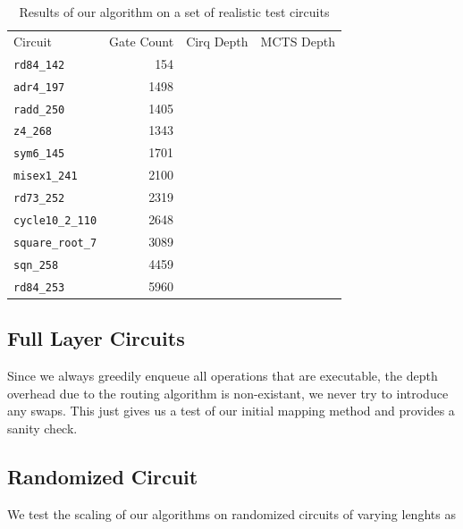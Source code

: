 \documentclass[%
 reprint,
 amsmath,amssymb,
 aps,
]{revtex4-2}
\begin{document}
\begin{table}[H]
    \caption{\label{tab:large-circuits}%
        Results of our algorithm on a set of realistic test circuits
    }
    \begin{ruledtabular}
        \begin{tabular}{lrrr}
            \textrm{Circuit}        &
            \textrm{Gate Count}     &
            \textrm{Cirq Depth}     &
            \textrm{MCTS Depth}                 \\
            \colrule

            \verb+rd84_142+ & 154  &  & \\
            \verb+adr4_197+ & 1498 &  & \\
            \verb+radd_250+ & 1405 &  & \\
            \verb+z4_268+ & 1343 &  & \\
            \verb+sym6_145+ & 1701 &  & \\
            \verb+misex1_241+ & 2100 &  & \\
            \verb+rd73_252+ & 2319 &  & \\
            \verb+cycle10_2_110+ & 2648 &  & \\
            \verb+square_root_7+ & 3089 &  & \\
            \verb+sqn_258+ & 4459 &  & \\
            \verb+rd84_253+ & 5960 &  & \\
        \end{tabular}
    \end{ruledtabular}
\end{table}

\subsection{\label{sec:results-full}Full Layer Circuits}

Since we always greedily enqueue all operations that are executable, the depth overhead due to the routing algorithm is non-existant, we never try to introduce any swaps. This just gives us a test of our initial mapping method and provides a sanity check.

\subsection{\label{sec:results-rnd}Randomized Circuit}

We test the scaling of our algorithms on randomized circuits of varying lenghts as
\end{document}

